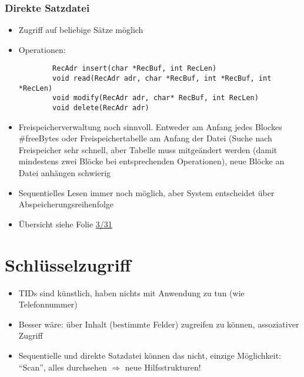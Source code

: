 \documentclass[a4paper, 12pt]{scrartcl}
\begin{document}
\subsubsection{Direkte Satzdatei}
\begin{itemize}
	\item
		Zugriff auf beliebige Sätze möglich
	\item
		Operationen:
		\begin{lstlisting}
		RecAdr insert(char *RecBuf, int RecLen)
		void read(RecAdr adr, char *RecBuf, int *RecBuf, int *RecLen)
		void modify(RecAdr adr, char* RecBuf, int RecLen)
		void delete(RecAdr adr)
		\end{lstlisting}
	\item
		Freispeicherverwaltung noch sinnvoll. Entweder am Anfang jedes Blockes \#freeBytes oder Freispeichertabelle am Anfang der Datei (Suche nach Freispeicher sehr schnell, aber Tabelle muss mitgeändert werden (damit mindestens zwei Blöcke bei entsprechenden Operationen), neue Blöcke an Datei anhängen schwierig
	\item
		Sequentielles Lesen immer noch möglich, aber System entscheidet über Abspeicherungsreihenfolge
	\item
		Übersicht siehe Folie \href{run:IDB-2015WS-03-Saetze.pdf}{3/31}
\end{itemize}
\section{Schlüsselzugriff}
\begin{itemize}
	\item
		TIDs sind künstlich, haben nichts mit Anwendung zu tun (wie Telefonnummer)
	\item
		Besser wäre: über Inhalt (bestimmte Felder) zugreifen zu können, assoziativer Zugriff
	\item
		Sequentielle und direkte Satzdatei können das nicht, einzige Möglichkeit: \enquote{Scan}, alles durchsehen $\Rightarrow$ neue Hilfsstrukturen!
\end{itemize}
\end{document}
